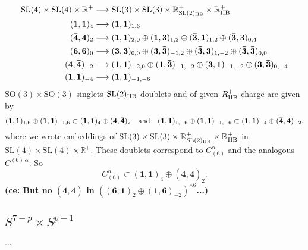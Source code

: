 \documentclass[11pt]{article}
\newcommand{\SO}{\ensuremath{\mathrm{SO}}\xspace}
\newcommand{\SL}{\ensuremath{\mathrm{SL}}\xspace}
\newcommand{\R}{\ensuremath{\mathbb{R}}\xspace}
\newcommand{\ce}[1]{\marginpar{\parbox{\marginparwidth}{\boldmath $\Longleftarrow$}}
{\boldmath\bfseries (ce: #1)}}
\begin{document}
  \begin{equation}
    \begin{aligned}
    \SL(4) \times \SL(4) \times \R^{+} & \longrightarrow \SL(3) \times \SL(3) \times \R^{+}_{\SL(2)_{\rm IIB}} \times \R^{+}_{\rm IIB} \\
    (\bm{1},\bm{1})_{4} & \longrightarrow (\bm{1},\bm{1})_{1,6}\\
    (\bm{\bar{4}},\bm{4})_{2} & \longrightarrow (\bm{1},\bm{1})_{2,0} \oplus (\bm{1},\bm{3})_{1,2} \oplus (\bm{\bar{3}},\bm{1})_{1,2} \oplus (\bm{\bar{3}},\bm{3})_{0,4} \\
    (\bm{6},\bm{6})_{0} & \longrightarrow (\bm{3},\bm{3})_{0,0} \oplus (\bm{3},\bm{\bar{3}})_{-1,2} \oplus (\bm{\bar{3}},\bm{3})_{1,-2} \oplus (\bm{\bar{3}},\bm{\bar{3}})_{0,0} \\
    (\bm{4},\bm{\bar{4}})_{-2} & \longrightarrow (\bm{1},\bm{1})_{-2,0} \oplus (\bm{1},\bm{\bar{3}})_{-1,-2} \oplus (\bm{3},\bm{1})_{-1,-2} \oplus (\bm{3},\bm{\bar{3}})_{0,-4} \\
    (\bm{1},\bm{1})_{-4} & \longrightarrow (\bm{1},\bm{1})_{-1,-6}
    \end{aligned}
  \end{equation}
  $\SO(3)\times\SO(3)$ singlets $\SL(2)_{\rm IIB}$ doublets and of given $R_{\rm IIB}^{+}$ charge are given by
  \begin{equation}
    (\bm{1},\bm{1})_{1,6} \oplus (\bm{1},\bm{1})_{-1,6} \subset (\bm{1},\bm{1})_{4} \oplus (\bm{4}, \bm{\bar{4}})_{2} \quad {\rm and} \quad (\bm{1},\bm{1})_{1,-6} \oplus (\bm{1},\bm{1})_{-1,-6} \subset (\bm{1},\bm{1})_{-4} \oplus (\bm{\bar{4}}, \bm{4})_{-2},
  \end{equation}
  where we wrote embeddings of $\SL(3) \times \SL(3) \times \R^{+}_{\SL(2)_{\rm IIB}} \times \R^{+}_{\rm IIB}$ in $\SL(4) \times \SL(4) \times \R^{+}$. These doublets correspond to $C_{(6)}^{\alpha}$ and the analogous $C^{(6)\,\alpha}$. So
  \begin{equation}
    C_{(6)}^{\alpha} \subset (\bm{1},\bm{1})_{4} \oplus (\bm{4},\bm{\bar{4}})_{2}.
  \end{equation}
  \ce{But no $(\bm{4},\bm{\bar{4}})$ in $\left((\bm{6},\bm{1})_{2}\oplus(\bm{1},\bm{6})_{-2}\right)^{\wedge 6}$...}

  \subsection{\texorpdfstring{$S^{7-p}\times S^{p-1}$}{S7-pxSp-1}}
  ...

\appendix
\end{document}

